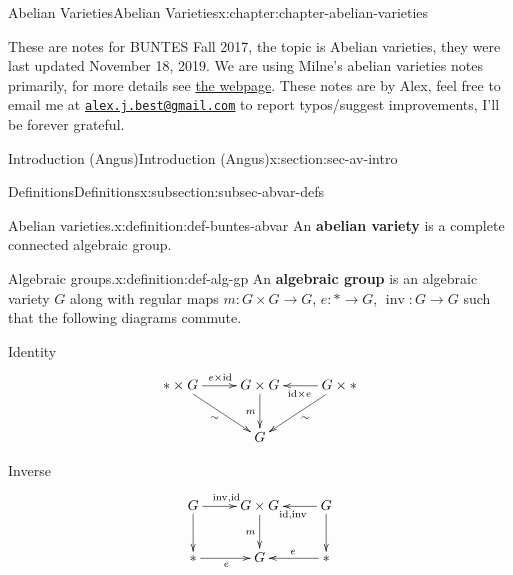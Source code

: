 \documentclass[oneside,10pt,]{book}
\newcommand{\terminology}[1]{\textbf{#1}}
\numberwithin{equation}{section}
\newcommand{\id}{\mathrm{id}}
\begin{document}
\begin{chapterptx}{Abelian Varieties}{}{Abelian Varieties}{}{}{x:chapter:chapter-abelian-varieties}
\begin{introduction}{}%
These are notes for BUNTES Fall 2017, the topic is Abelian varieties, they were last updated November 18, 2019. We are using Milne's abelian varieties notes primarily, for more details see \href{http://math.bu.edu/people/angusmca/buntes/fall2017.html}{the webpage}. These notes are by Alex, feel free to email me at \href{mailto:alex.j.best@gmail.com}{\nolinkurl{alex.j.best@gmail.com}} to report typos\slash{}suggest improvements, I'll be forever grateful.%
\end{introduction}%
%
%
\typeout{************************************************}
\typeout{************************************************}
%
\begin{sectionptx}{Introduction (Angus)}{}{Introduction (Angus)}{}{}{x:section:sec-av-intro}
%
%
\typeout{************************************************}
\typeout{************************************************}
%
\begin{subsectionptx}{Definitions}{}{Definitions}{}{}{x:subsection:subsec-abvar-defs}
\begin{definition}{Abelian varieties.}{x:definition:def-buntes-abvar}%
An \terminology{abelian variety} is a complete connected algebraic group.%
\end{definition}
\begin{definition}{Algebraic groups.}{x:definition:def-alg-gp}%
An \terminology{algebraic group} is an algebraic variety \(G\) along with regular maps \(m\colon G\times G\to G\), \(e \colon * \to G\),  \(\operatorname{inv}\colon G\to G\) such that the following diagrams commute.%
\par
Identity%
\begin{equation*}
\xymatrix{
\ast\times G\ar[dr]_{\sim}\ar[r]^{e\times \id} & G\times G\ar[d]_m &G\times \ast\ar[l]^{\id\times e}\ar[dl]^\sim\\
& G &
}
\end{equation*}
%
\par
Inverse%
\begin{equation*}
\xymatrix{
G\ar[d]\ar[r]^{\operatorname{inv}, \id} & G\times G\ar[d]_m &G\ar[l]^{\id, \operatorname{inv}}\ar[d]\\
\ast\ar[r]_e& G &\ast\ar[l]_e
}
\end{equation*}
%
\par

\end{definition}
\end{subsectionptx}
\end{sectionptx}
\end{chapterptx}
\end{document}
